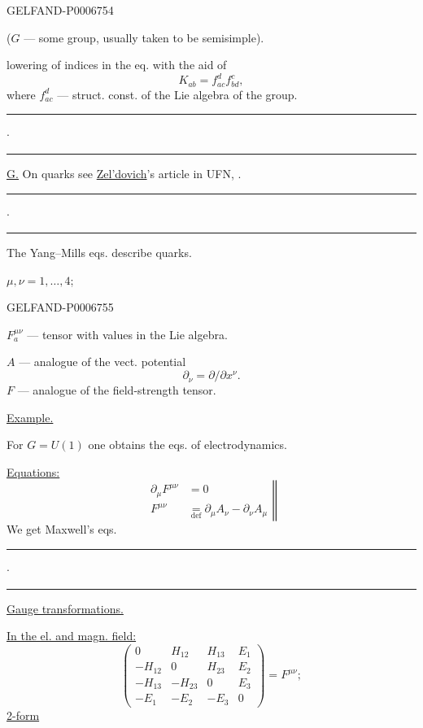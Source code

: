 \begin{GelfandAdjacentEvidence}{GELFAND-P000675}{4}


(\(G\) --- some group, usually taken to be semisimple).

lowering of indices in the eq. with the aid of
\[
K_{ab}=f_{ac}^d f_{bd}^c,
\]
where \(f_{ac}^d\) --- struct. const. of the Lie algebra of the group.

\noindent\rule{9mm}{.45pt}\enspace\(\cdot\)\enspace\rule{12mm}{.45pt}

\underline{\underline{G.}} On quarks see \underline{Zel’dovich}’s article in UFN, .

\noindent\rule{9mm}{.45pt}\enspace\(\cdot\)\enspace\rule{12mm}{.45pt}

The Yang–Mills eqs. describe quarks.

\(\mu,\nu=1,\ldots,4\);
\end{GelfandAdjacentEvidence}
\begin{GelfandAdjacentEvidence}{GELFAND-P000675}{5}

\(F_a^{\mu\nu}\) --- tensor with values in the Lie algebra.

\(A\) --- analogue of the vect. potential
\[
\partial_\nu=\partial/\partial x^\nu.
\]
\(F\) --- analogue of the field-strength tensor.

\underline{Example.}

For \(G=U(1)\) one obtains the eqs. of electrodynamics.

\underline{Equations:}
\[
\left.
\begin{aligned}
\partial_\mu F^{\mu\nu}&=0\\
F^{\mu\nu}&\underset{\mathrm{def}}{=}\partial_\mu A_\nu-\partial_\nu A_\mu
\end{aligned}
\right\Vert
\]
We get Maxwell’s eqs.

\noindent\rule{10mm}{.45pt}\enspace\(\cdot\)\enspace\rule{12mm}{.45pt}

\underline{Gauge transformations.}

\underline{In the el. and magn. field:}
\[
\begin{pmatrix}
0&H_{12}&H_{13}&E_1\\
-H_{12}&0&H_{23}&E_2\\
-H_{13}&-H_{23}&0&E_3\\
-E_1&-E_2&-E_3&0
\end{pmatrix}
=F^{\mu\nu};
\]
\underline{2-form}
\end{GelfandAdjacentEvidence}
